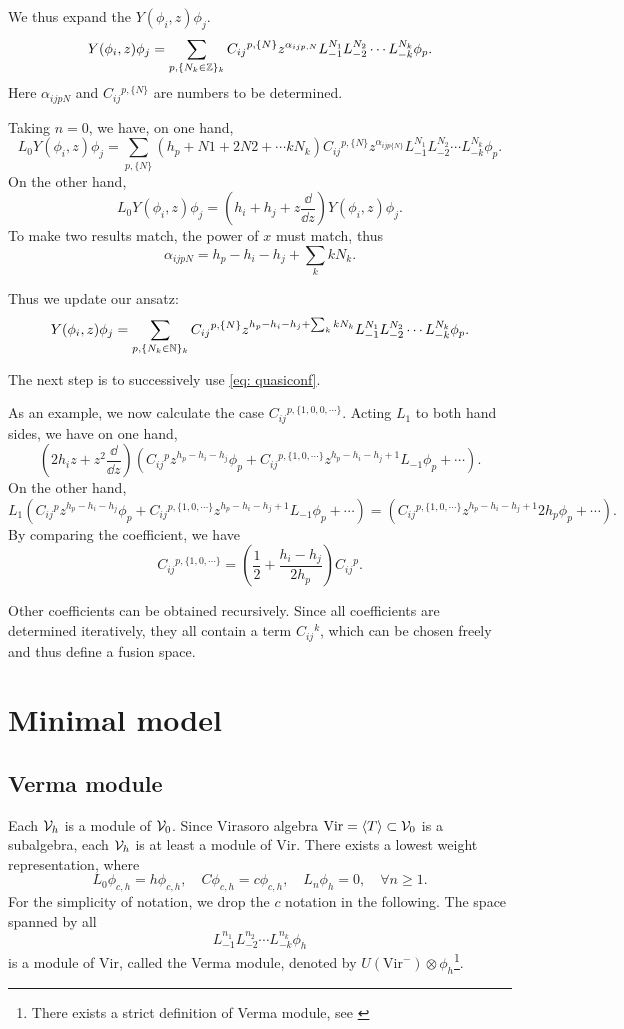 \documentclass{article}
\begin{document}
We thus expand the $Y(\phi_i, z)\phi_j$. 
\[
Y(\phi_i, z)\phi_j = \sum_{p, \{N_k\in\mathbb{Z}\}_{k}}C_{ij}{}^{p,\{N\}}z^{\alpha_{ijp,{N}}}L_{-1}^{N_1}L_{-2}^{N_2}\cdots L_{-k}^{N_k}\phi_p.
\]
Here $\alpha_{ijpN}$ and $C_{ij}{}^{p,\{N\}}$ are numbers to be determined.

Taking $n = 0$, we have, on one hand,
\[
L_0 Y(\phi_i, z)\phi_j = \sum_{p,\{N\}}(h_p+N1+2N2+\cdots kN_k)C_{ij}{}^{p,\{N\}}z^{\alpha_{ijp\{N\}}}L_{-1}^{N_1}L_{-2}^{N_2}\cdots L_{-k}^{N_k}\phi_p.
\]
On the other hand, 
\[
L_0 Y(\phi_i, z)\phi_j = \left(h_i+h_j+z\frac{\dd}{\dd z}\right)Y(\phi_i,z)\phi_j.
\]
To make two results match, the power of $x$ must match, thus
\[
\alpha_{ijpN} = h_p-h_i-h_j+\sum_{k}kN_k.
\]

Thus we update our ansatz:
\[
Y(\phi_i, z)\phi_j = \sum_{p, \{N_k\in\mathbb{N}\}_{k}}C_{ij}{}^{p,\{N\}}z^{h_p-h_i-h_j+\sum_{k}kN_k}L_{-1}^{N_1}L_{-2}^{N_2}\cdots L_{-k}^{N_k}\phi_p.
\]

The next step is to successively use \eqref{eq: quasiconf}. 

As an example, we now calculate the case $C_{ij}{}^{p,\{1,0,0,\cdots\}}$. Acting $L_1$ to both hand sides, we have on one hand, 
\[
\left(2h_i z + z^2\frac{\dd}{\dd z}\right)\left(C_{ij}{}^p z^{h_p-h_i-h_j}\phi_p+C_{ij}{}^{p,\{1,0,\cdots\}}z^{h_p-h_i-h_j+1}L_{-1}\phi_p + \cdots\right).
\]
On the other hand,
\[
L_1\left(C_{ij}{}^p z^{h_p-h_i-h_j}\phi_p+C_{ij}{}^{p,\{1,0,\cdots\}}z^{h_p-h_i-h_j+1}L_{-1}\phi_p + \cdots\right) = \left(C_{ij}{}^{p,\{1,0,\cdots\}}z^{h_p-h_i-h_j+1}2h_p\phi_p + \cdots\right).
\]
By comparing the coefficient, we have
\[
C_{ij}{}^{p,\{1,0,\cdots\}} = \left(\frac{1}{2} + \frac{h_i-h_j}{2h_p}\right) C_{ij}{}^{p}.
\]

Other coefficients can be obtained recursively. Since all coefficients are determined iteratively, they all contain a term $C_{ij}{}^k$, which can be chosen freely and thus define a fusion space.

\section{Minimal model}
\subsection{Verma module}
Each ${\cal V}_h$ is a module of ${\cal V}_0$. Since Virasoro algebra $\mathrm{Vir} = \langle T\rangle\subset {\cal V}_0$ is a subalgebra, each ${\cal V}_h$ is at least a module of $\mathrm{Vir}$. There exists a lowest weight representation, where
\[
L_0\phi_{c,h} = h\phi_{c,h},\quad C\phi_{c,h} = c\phi_{c,h},\quad L_{n}\phi_h = 0,\quad \forall n\geq 1.
\]
For the simplicity of notation, we drop the $c$ notation in the following. The space spanned by all
\[
L_{-1}^{n_1}L_{-2}^{n_2}\cdots L_{-k}^{n_k}\phi_{h}
\]
is a module of $\mathrm{Vir}$, called the Verma module, denoted by $U(\mathrm{Vir}^-)\otimes \phi_h$\footnote{There exists a strict definition of Verma module, see \cite{Wikipedia:Verma_module}}.
\end{document}
